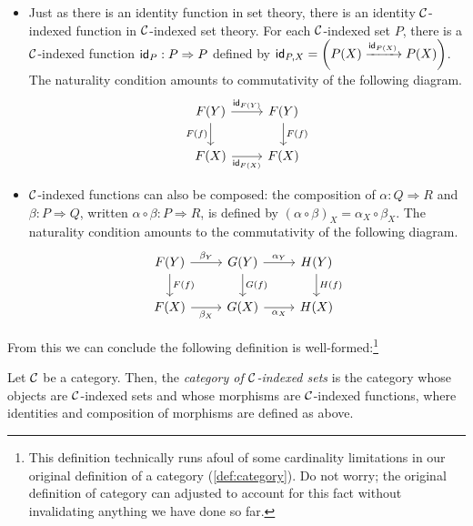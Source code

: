 \begin{itemize}
\item Just as there is an identity function in set theory,
  there is an identity \(\mathcal C\)-indexed function in \(\mathcal C\)-indexed set theory.
  For each \(\mathcal C\)-indexed set \(P\),
  there is a \(\mathcal C\)-indexed function \(\mathsf{id}_P : P \Rightarrow P\)
  defined by \(\mathsf{id}_{P,X} = \left(P(X) \xrightarrow{\mathsf{id}_{P(X)}} P(X)\right)\).
  The naturality condition amounts to commutativity of the following diagram.
  \[%
\begin{tikzcd}
F(Y) \arrow[r, "\idt_{F(Y)}"] \arrow[d, "F(f)"'] & F(Y) \arrow[d, "F(f)"] \\
F(X) \arrow[r, "\idt_{F(X)}"']                 & F(X)
\end{tikzcd}\]
\item \(\mathcal C\)-indexed functions can also be composed:
  the composition of \(\alpha : Q \Rightarrow R\)
  and \(\beta: P \Rightarrow Q\),
  written \(\alpha\circ\beta : P \Rightarrow R\),
  is defined by \((\alpha\circ\beta)_X = \alpha_X \circ \beta_X\).
  The naturality condition amounts to the commutativity of the following diagram.
  \[
\begin{tikzcd}
F(Y) \arrow[d, "F(f)"] \arrow[r, "\beta_Y"] & G(Y) \arrow[d, "G(f)"] \arrow[r, "\alpha_Y"] & H(Y) \arrow[d, "H(f)"] \\
F(X) \arrow[r, "\beta_X"']                & G(X) \arrow[r, "\alpha_X"']                & H(X)
\end{tikzcd}
\]
\end{itemize}

From this we can conclude the following definition 
is well-formed:\footnote{This definition technically runs afoul of some cardinality 
limitations in our original definition of a category (\cref{def:category}). 
Do not worry; the original definition of category can adjusted to account 
for this fact without invalidating anything we have done so far.}
\begin{definition}
  \sloppy
  Let $\mathcal C$ be a category. Then, the \emph{category of $\mathcal C$-indexed sets}
  is the category whose objects are $\mathcal C$-indexed 
  sets and whose morphisms are $\mathcal C$-indexed functions, 
  where identities and composition of morphisms are defined as above.
\end{definition}

